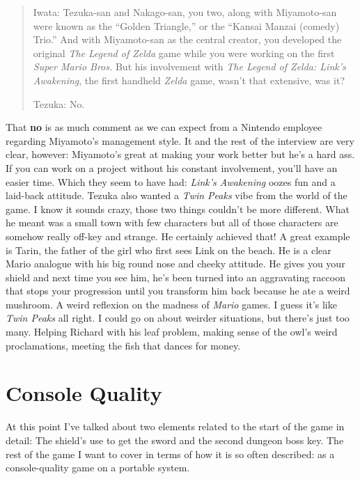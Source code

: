\documentclass{book}
\begin{document}
\begin{quote}
Iwata: Tezuka-san and Nakago-san, you two, along with Miyamoto-san were known as the “Golden Triangle,” or the “Kansai Manzai (comedy) Trio.” And with Miyamoto-san as the central creator, you developed the original \emph{The Legend of Zelda} game while you were working on the first \emph{Super Mario Bros.} But his involvement with \emph{The Legend of Zelda: Link’s Awakening}, the first handheld \emph{Zelda} game, wasn’t that extensive, was it?\par
Tezuka: No.\par
\end{quote} \par
That \textbf{no} is as much comment as we can expect from a Nintendo employee regarding Miyamoto’s management style. It and the rest of the interview are very clear, however: Miyamoto’s great at making your work better but he’s a hard ass. If you can work on a project without his constant involvement, you’ll have an easier time. Which they seem to have had: \emph{Link’s Awakening} oozes fun and a laid-back attitude. Tezuka also wanted a \emph{Twin Peaks} vibe from the world of the game. I know it sounds crazy, those two things couldn’t be more different. What he meant was a small town with few characters but all of those characters are somehow really off-key and strange. He certainly achieved that! A great example is Tarin, the father of the girl who first sees Link on the beach. He is a clear Mario analogue with his big round nose and cheeky attitude. He gives you your shield and next time you see him, he’s been turned into an aggravating raccoon that stops your progression until you transform him back because he ate a weird mushroom. A weird reflexion on the madness of \emph{Mario} games. I guess it’s like \emph{Twin Peaks} all right. I could go on about weirder situations, but there’s just too many. Helping Richard with his leaf problem, making sense of the owl’s weird proclamations, meeting the fish that dances for money.\par
\FloatBarrier\section*{Console Quality}
At this point I’ve talked about two elements related to the start of the game in detail: The shield’s use to get the sword and the second dungeon boss key. The rest of the game I want to cover in terms of how it is so often described: as a console-quality game on a portable system.\par
\end{document}
